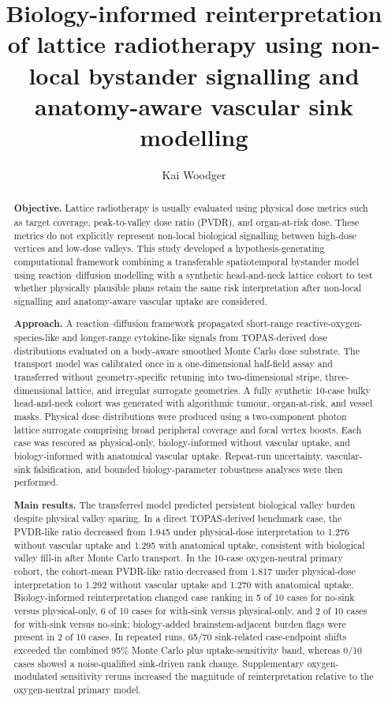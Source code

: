 \documentclass[10pt,a4paper]{article}
\title{\bfseries Biology-informed reinterpretation of lattice radiotherapy using non-local bystander signalling and anatomy-aware vascular sink modelling}
\author[1]{Kai Woodger}
\affil[1]{\small [University of Sydney], Sydney, Australia}
\date{}
\begin{document}
\maketitle
\vspace{-1.2em}

\begin{abstract}
\textbf{Objective.} Lattice radiotherapy is usually evaluated using physical dose metrics such as target coverage, peak-to-valley dose ratio (PVDR), and organ-at-risk dose. These metrics do not explicitly represent non-local biological signalling between high-dose vertices and low-dose valleys. This study developed a hypothesis-generating computational framework combining a transferable spatiotemporal bystander model using reaction--diffusion modelling with a synthetic head-and-neck lattice cohort to test whether physically plausible plans retain the same risk interpretation after non-local signalling and anatomy-aware vascular uptake are considered.

\textbf{Approach.} A reaction--diffusion framework propagated short-range reactive-oxygen-species-like and longer-range cytokine-like signals from TOPAS-derived dose distributions evaluated on a body-aware smoothed Monte Carlo dose substrate. The transport model was calibrated once in a one-dimensional half-field assay and transferred without geometry-specific retuning into two-dimensional stripe, three-dimensional lattice, and irregular surrogate geometries. A fully synthetic 10-case bulky head-and-neck cohort was generated with algorithmic tumour, organ-at-risk, and vessel masks. Physical dose distributions were produced using a two-component photon lattice surrogate comprising broad peripheral coverage and focal vertex boosts. Each case was rescored as physical-only, biology-informed without vascular uptake, and biology-informed with anatomical vascular uptake. Repeat-run uncertainty, vascular-sink falsification, and bounded biology-parameter robustness analyses were then performed.

\textbf{Main results.} The transferred model predicted persistent biological valley burden despite physical valley sparing. In a direct TOPAS-derived benchmark case, the PVDR-like ratio decreased from 1.945 under physical-dose interpretation to 1.276 without vascular uptake and 1.295 with anatomical uptake, consistent with biological valley fill-in after Monte Carlo transport. In the 10-case oxygen-neutral primary cohort, the cohort-mean PVDR-like ratio decreased from 1.817 under physical-dose interpretation to 1.292 without vascular uptake and 1.270 with anatomical uptake. Biology-informed reinterpretation changed case ranking in 5 of 10 cases for no-sink versus physical-only, 6 of 10 cases for with-sink versus physical-only, and 2 of 10 cases for with-sink versus no-sink; biology-added brainstem-adjacent burden flags were present in 2 of 10 cases. In repeated runs, 65/70 sink-related case-endpoint shifts exceeded the combined 95\% Monte Carlo plus uptake-sensitivity band, whereas 0/10 cases showed a noise-qualified sink-driven rank change. Supplementary oxygen-modulated sensitivity reruns increased the magnitude of reinterpretation relative to the oxygen-neutral primary model.


\end{abstract}
\end{document}
